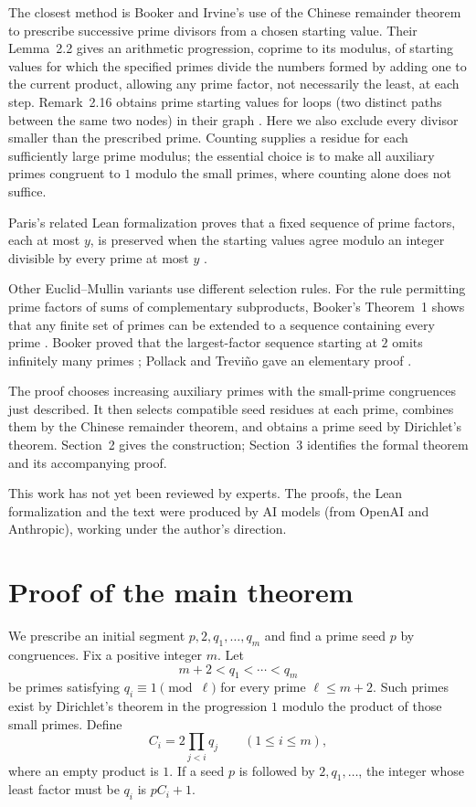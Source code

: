 \documentclass[11pt]{article}
\begin{document}
The closest method is Booker and Irvine's use of the Chinese remainder
theorem to prescribe successive prime divisors from a chosen starting
value. Their Lemma~2.2 gives an arithmetic progression, coprime to its
modulus, of starting values for which the specified primes divide the
numbers formed by adding one to the current product, allowing any prime
factor, not necessarily the least, at each step. Remark~2.16 obtains prime
starting values for loops (two distinct paths between the same two nodes) in their graph
\cite{booker-irvine}. Here we also exclude every divisor smaller than the prescribed
prime. Counting supplies a residue for each sufficiently large prime modulus;
the essential choice is to make all auxiliary primes congruent to $1$
modulo the small primes, where counting alone does not suffice.

Paris's related Lean formalization proves that a fixed sequence of prime
factors, each at most $y$, is preserved when the starting values agree
modulo an integer divisible by every prime at most $y$
\cite[\S4.3, item~(i)]{paris}.

Other Euclid--Mullin variants use different selection rules.
For the rule permitting prime factors of sums of complementary
subproducts, Booker's Theorem~1 shows that any finite set of primes can
be extended to a sequence containing every prime \cite{booker-variant}.
Booker proved that the largest-factor sequence starting at $2$ omits
infinitely many primes \cite[Theorem~1]{booker-second}; Pollack and Trevi\~no gave
an elementary proof
\cite[\S1, Theorem (Booker)]{pollack-trevino}.

The proof chooses increasing auxiliary primes with the small-prime
congruences just described. It then selects compatible seed residues at
each prime, combines them by the Chinese remainder theorem, and obtains
a prime seed by Dirichlet's theorem. Section~2 gives the construction;
Section~3 identifies the formal theorem and its accompanying proof.

This work has not yet been reviewed by experts.
The proofs, the Lean formalization and the text were produced by AI models
(from OpenAI and Anthropic), working under the author's direction.

\section{Proof of the main theorem}

We prescribe an initial segment $p,2,q_1,\ldots,q_m$ and find a prime
seed $p$ by congruences. Fix a positive integer $m$. Let
\[
 m+2<q_1<\cdots<q_m
\]
be primes satisfying $q_i\equiv1\pmod\ell$ for every prime
$\ell\leq m+2$. Such primes exist by Dirichlet's theorem in the
progression $1$ modulo the product of those small primes. Define
\[
 C_i=2\prod_{j<i}q_j\qquad(1\leq i\leq m),
\]
where an empty product is $1$. If a seed $p$ is followed by $2,q_1,\ldots$,
the integer whose least factor must be $q_i$ is $pC_i+1$.
\end{document}
